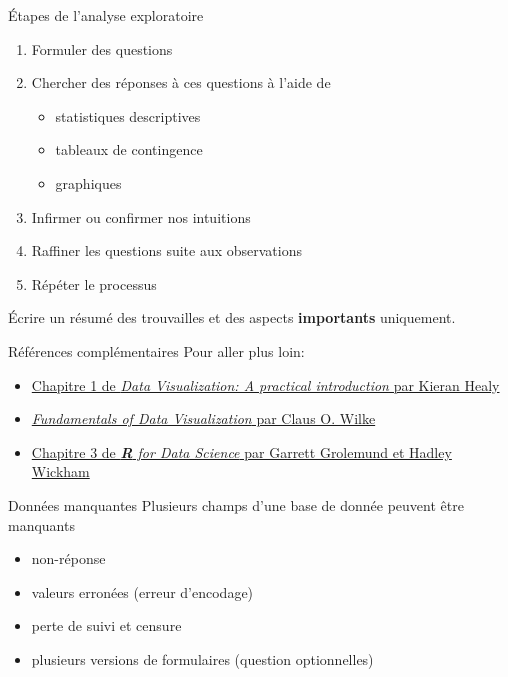 \documentclass[
  ignorenonframetext,
]{beamer}
\providecommand{\tightlist}{%
  \setlength{\itemsep}{0pt}\setlength{\parskip}{0pt}}\usepackage{longtable,booktabs,array}
\begin{document}
\begin{frame}{Étapes de l'analyse exploratoire}
\protect\hypertarget{uxe9tapes-de-lanalyse-exploratoire}{}
\begin{enumerate}
\tightlist
\item
  Formuler des questions
\item
  Chercher des réponses à ces questions à l'aide de

  \begin{itemize}
  \tightlist
  \item
    statistiques descriptives
  \item
    tableaux de contingence
  \item
    graphiques
  \end{itemize}
\item
  Infirmer ou confirmer nos intuitions
\item
  Raffiner les questions suite aux observations
\item
  Répéter le processus
\end{enumerate}

Écrire un résumé des trouvailles et des aspects \textbf{importants}
uniquement.
\end{frame}

\begin{frame}{Références complémentaires}
\protect\hypertarget{ruxe9fuxe9rences-compluxe9mentaires}{}
Pour aller plus loin:

\begin{itemize}
\tightlist
\item
  \href{https://socviz.co/lookatdata.html\#lookatdata}{Chapitre 1 de
  \emph{Data Visualization: A practical introduction} par Kieran Healy}
\item
  \href{https://serialmentor.com/dataviz/}{\emph{Fundamentals of Data
  Visualization} par Claus O. Wilke}
\item
  \href{https://r4ds.had.co.nz/}{Chapitre 3 de \emph{\textbf{R} for Data
  Science} par Garrett Grolemund et Hadley Wickham}
\end{itemize}
\end{frame}

\begin{frame}{Données manquantes}
\protect\hypertarget{donnuxe9es-manquantes}{}
Plusieurs champs d'une base de donnée peuvent être manquants

\begin{itemize}
\tightlist
\item
  non-réponse
\item
  valeurs erronées (erreur d'encodage)
\item
  perte de suivi et censure
\item
  plusieurs versions de formulaires (question optionnelles)
\end{itemize}
\end{frame}
\end{document}
